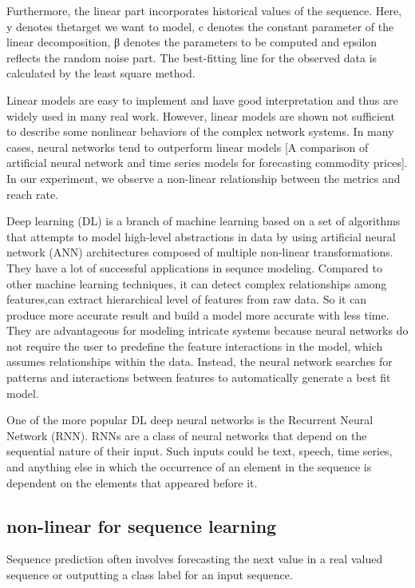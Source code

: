 \documentclass[5p]{elsarticle}
\newcommand{\dabiaolv}{reach rate}
\begin{document}
Furthermore, the linear part incorporates historical values of the sequence. Here, y denotes thetarget we want to model, c denotes the constant parameter of the linear decomposition, β denotes the parameters to be computed and epsilon reflects the random noise part. The best-fitting line for the observed data is calculated by the least square method.


Linear models are easy to implement and have good interpretation and thus are widely used in many real work. However, linear models are shown not sufficient to describe some nonlinear behaviors of the complex network systems. In many cases, neural networks tend to outperform linear models [A comparison of artificial neural network and time series models for forecasting commodity prices]. In our experiment, we observe a non-linear relationship between the metrics and \dabiaolv.

Deep learning (DL) is a branch of machine learning based on a set of algorithms that attempts to model high-level abstractions in data by using artificial neural network (ANN) architectures composed of multiple non-linear transformations. They have a lot of successful applications in sequnce modeling. Compared to other machine learning techniques, it can detect complex relationships among features,can extract hierarchical level of features from raw data. So it can produce more accurate result and build a model more accurate with less time. They are advantageous for modeling intricate systems because neural networks do not require the user to predefine the feature interactions in the model, which assumes relationships within the data. Instead, the neural network searches for patterns and interactions between features to automatically generate a best fit model.

One of the more popular DL deep neural networks is the Recurrent Neural Network (RNN). RNNs are a class of neural networks that depend on the sequential nature of their input. Such inputs could be text, speech, time series, and anything else in which the occurrence of an element in the sequence is dependent on the elements that appeared before it.

\subsection{non-linear for sequence learning}
Sequence prediction often involves forecasting the next value in a real valued sequence or outputting a class label for an input sequence.
\end{document}
